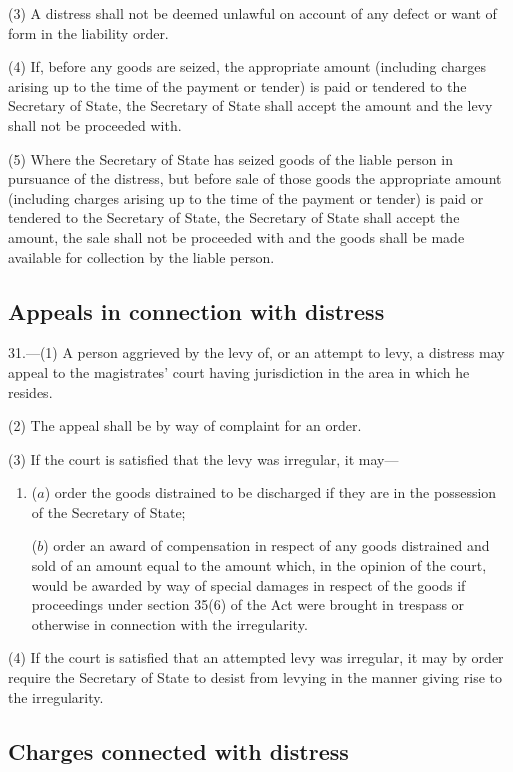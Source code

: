 \documentclass[a4paper]{article}
\begin{document}
(3) A distress shall not be deemed unlawful on account of any defect or want of form in the liability order.

(4) If, before any goods are seized, the appropriate amount (including charges arising up to the time of the payment or tender) is paid or tendered to the Secretary of State, the Secretary of State shall accept the amount and the levy shall not be proceeded with.

(5) Where the Secretary of State has seized goods of the liable person in pursuance of the distress, but before sale of those goods the appropriate amount (including charges arising up to the time of the payment or tender) is paid or tendered to the Secretary of State, the Secretary of State shall accept the amount, the sale shall not be proceeded with and the goods shall be made available for collection by the liable person.

\subsection[31. Appeals in connection with distress]{Appeals in connection with distress}

31.—(1) A person aggrieved by the levy of, or an attempt to levy, a distress may appeal to the magistrates' court having jurisdiction in the area in which he resides.

(2) The appeal shall be by way of complaint for an order.

(3) If the court is satisfied that the levy was irregular, it may—
\begin{enumerate}\item[]
($a$) order the goods distrained to be discharged if they are in the possession of the Secretary of State;

($b$) order an award of compensation in respect of any goods distrained and sold of an amount equal to the amount which, in the opinion of the court, would be awarded by way of special damages in respect of the goods if proceedings under section 35(6) of the Act were brought in trespass or otherwise in connection with the irregularity.
\end{enumerate}

(4) If the court is satisfied that an attempted levy was irregular, it may by order require the Secretary of State to desist from levying in the manner giving rise to the irregularity.

\subsection[32. Charges connected with distress]{Charges connected with distress}
\end{document}
